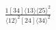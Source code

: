 \documentclass[varwidth, border=5pt]{standalone}
\begin{document}
\begin{my}
$\begin{gathered}
\scriptscriptstyle\frac{1[34]⟨13⟩⟨25⟩^2}{⟨12⟩^2[24]⟨34⟩^2}
\end{gathered}$
\end{my}
\end{document}
